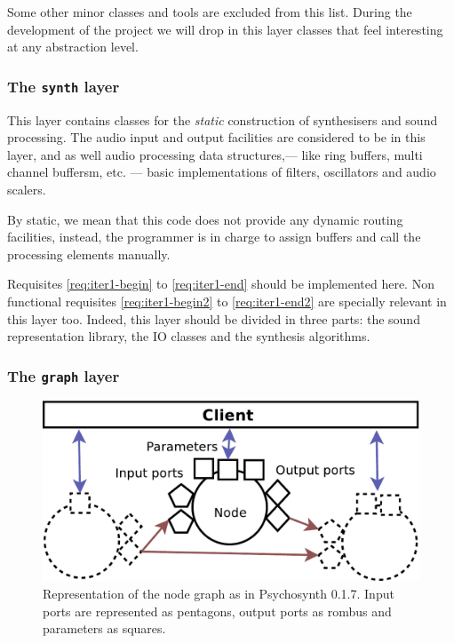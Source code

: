 Some other minor classes and tools are excluded from this list. During
the development of the project we will drop in this layer classes that
feel interesting at any abstraction level.

\subsubsection{The \texttt{synth} layer}

This layer contains classes for the \emph{static}
construction of synthesisers and sound processing. The audio input and
output facilities are considered to be in this layer, and as well
audio processing data structures,--- like ring buffers, multi channel
buffersm, etc. --- basic implementations of filters, oscillators and
audio scalers.

By static, we mean that this code does not provide any dynamic routing
facilities, instead, the programmer is in charge to assign buffers and
call the processing elements manually.

Requisites \ref{req:iter1-begin} to \ref{req:iter1-end} should be
implemented here. Non functional requisites \ref{req:iter1-begin2} to
\ref{req:iter1-end2} are specially relevant in this layer too. Indeed,
this layer should be divided in three parts: the sound representation
library, the IO classes and the synthesis algorithms.

\subsubsection{The \texttt{graph} layer}

\begin{figure}[h]
\centering
\includegraphics[width=.8\textwidth]{pic/node.pdf}
\caption[Representation of the node graph as in Psychosynth
0.1.7]{Representation of the node graph as in Psychosynth 0.1.7. Input
ports are represented as pentagons, output ports as rombus and
parameters as squares.}
\label{fig:node}
\end{figure}

